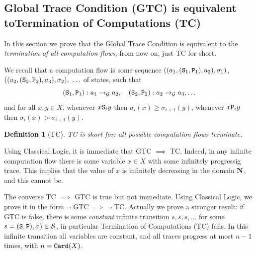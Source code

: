 \documentclass{lmcs}
\newtheorem{definition}[theorem]{Definition}
\begin{document}
\subsection{Global Trace Condition (GTC) is equivalent toTermination of Computations (TC)}
\label{subsection-TC}
In this section we prove that the Global Trace Condition is equivalent to
the \emph{termination of all computation flows}, from now on, just TC for short.

We recall that a computation flow is some sequence 
$((a_1,({\tt S}_1,{\tt P}_1),a_2),\sigma_1)$,
$((a_2,(\Stat_2,\Prog_2),a_3),\sigma_2), \ \ldots$ of states, such that
$$\composable{\setG}{a_1}{a_2}{(\Stat_1,\Prog_1)}, \ \ \ 
\composable{\setG}{a_2}{a_3}{(\Stat_2,\Prog_2)}, \ldots$$ and
for all $x, y \in X$, whenever $x {\tt S}_i y$ then $\sigma_i(x) \ge \sigma_{i+1}(y)$,
whenever $x {\tt P}_i y$ then $\sigma_i(x) > \sigma_{i+1}(y)$.

\begin{definition}[TC]
TC is short for: all possible computation flows terminate.
\end{definition}

Using Classical Logic, 
it is immediate that GTC $\implies$ TC. Indeed, in any infinite computation 
flow there is some variable $x \in X$ with some infinitely progressig trace. 
This implies that the value of $x$ is infinitely decreasing in the domain ${\bf N}$,
and this cannot be. 


The converse TC $\implies$ GTC is true but not immediate. Using Classical 
Logic, we prove it in the form $\neg$ GTC $\implies$ $\neg$ TC. Actually
we prove a stronger result: if GTC is false, there is some \emph{constant}
infinite transition $s, s, s, \ldots$ for some $s = ({\tt S},{\tt P}),\sigma) \in {\mathcal S}$,
in particular Termination of Computations (TC) fails. In this infinite
transition all variables are constant, and all 
traces progress at most $n-1$ times, with $n={\tt Card}(X)$.
\end{document}
